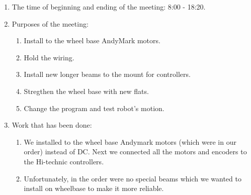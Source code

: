 \begin{enumerate}
	
	\item The time of beginning and ending of the meeting: 8:00 - 18:20.
	
	\item Purposes of the meeting: 
	\begin{enumerate}
		
		\item Install to the wheel base AndyMark motors.
		
		\item Hold the wiring.
		
        \item Install new longer beams to the mount for controllers.
        
        \item Stregthen the wheel base with new flats.
        
        \item Change the program and test robot's motion.
		
	\end{enumerate}

	\item Work that has been done:
	\begin{enumerate}
		
		\item We installed to the wheel base Andymark motors (which were in our order) instead of DC. Next we connected all the motors and encoders to the Hi-technic controllers.
		
		\item Unfortunately, in the order were no special beams which we wanted to install on wheelbase to make it more reliable.
		\begin{figure}[H]
			\begin{minipage}[h]{0.2\linewidth}
				\center  
			\end{minipage}
			\begin{minipage}[h]{0.6\linewidth}
				\caption{}
			\end{minipage}
		\end{figure}
		

\end{enumerate}
\end{enumerate}
